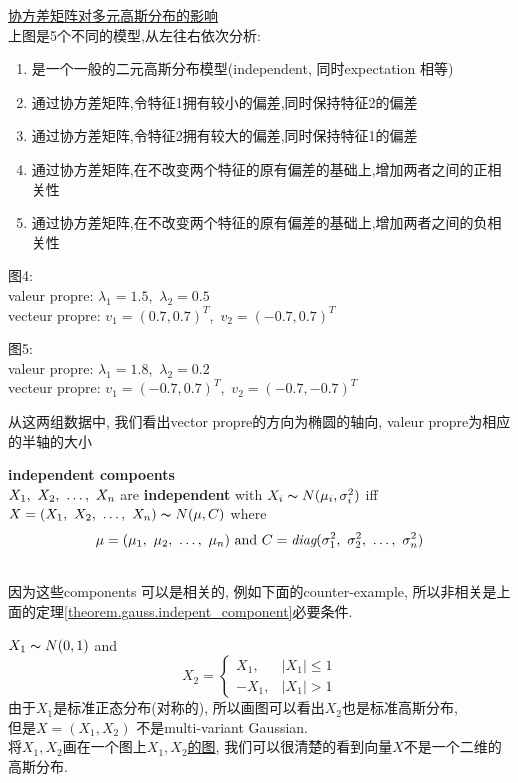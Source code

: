\documentclass{article}
\begin{document}
\href{http://www.ryanzhang.info/wp-content/uploads/2013/07/QQ\%E6\%88\%AA\%E5\%9B\%BE20130706200349.png}{协方差矩阵对多元高斯分布的影响}\\
上图是5个不同的模型,从左往右依次分析:
\begin{enumerate}
\item 是一个一般的二元高斯分布模型(independent, 同时expectation 相等)
\item 通过协方差矩阵,令特征1拥有较小的偏差,同时保持特征2的偏差
\item 通过协方差矩阵,令特征2拥有较大的偏差,同时保持特征1的偏差
\item 通过协方差矩阵,在不改变两个特征的原有偏差的基础上,增加两者之间的正相关性
\item 通过协方差矩阵,在不改变两个特征的原有偏差的基础上,增加两者之间的负相关性
\end{enumerate}

图4:\\
valeur propre:
$\lambda_1 = 1.5$,\
$\lambda_2 = 0.5$\\
vecteur propre:
$v_1 = (0.7, 0.7)^T$,\
$v_2 = (-0.7, 0.7)^T$

图5:\\
valeur propre:
$\lambda_1 = 1.8$,\
$\lambda_2 = 0.2$\\
vecteur propre:
$v_1 = (-0.7, 0.7)^T$,\
$v_2 = (-0.7, -0.7)^T$

从这两组数据中, 我们看出vector propre的方向为椭圆的轴向, valeur propre为相应的半轴的大小

\begin{theorem}
\textbf{independent compoents}\\
$X_1,~X_2,~\ldots,~X_n$ are \textbf{independent} with $X_i \thicksim{N}(\mu_i, \sigma_i^2)$ iff $X = (X_1,~X_2,~\ldots,~X_n) \thicksim{N}(\mu, C)$ where
$$\mu = (\mu_1,~\mu_2,~\ldots,~\mu_n) \hbox{ and } C = \textit{diag}(\sigma^2_1,~\sigma^2_2,~\ldots,~\sigma^2_n)$$
\label{theorem.gauss.indepent_component}
\end{theorem}

\\
因为这些components 可以是相关的, 例如下面的counter-example, 所以非相关是上面的定理\ref{theorem.gauss.indepent_component}必要条件.
\begin{example}
$X_1 \thicksim{N}(0,1)$ and
$$
X_2 =
    \left\{
       \begin{array}{ll}
          X_1, & |X_1| \leq 1 \\
          - X_1, & |X_1| > 1
        \end{array}
    \right.
$$
由于$X_1$是标准正态分布(对称的), 所以画图可以看出$X_2$也是标准高斯分布,\\
但是$X=(X_1, X_2)$ 不是multi-variant Gaussian.\\
将$X_1, X_2$画在一个图上\href{http://i.imgbox.com/gmRq7VFK.png}{$X_1, X_2$的图}, 我们可以很清楚的看到向量$X$不是一个二维的高斯分布.
\end{example}
\end{document}
